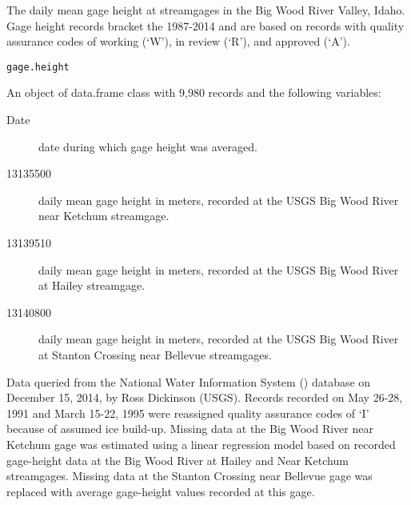 \documentclass[a4paper]{book}
\begin{document}
%
\begin{Description}\relax
The daily mean gage height at streamgages in the Big Wood River Valley, Idaho.
Gage height records bracket the 1987-2014 and are based on records with
quality assurance codes of working (`W'), in review (`R'), and
approved (`A').
\end{Description}
%
\begin{Usage}
\begin{verbatim}
gage.height
\end{verbatim}
\end{Usage}
%
\begin{Format}
An object of data.frame class with 9,980 records and the following variables:
\begin{description}

\item[Date] date during which gage height was averaged.
\item[13135500] daily mean gage height in meters, recorded at the USGS
Big Wood River near Ketchum streamgage.
\item[13139510] daily mean gage height in meters, recorded at the USGS
Big Wood River at Hailey streamgage.
\item[13140800] daily mean gage height in meters, recorded at the USGS
Big Wood River at Stanton Crossing near Bellevue streamgages.

\end{description}
\end{Format}
%
\begin{Source}\relax
Data queried from the National Water Information System
() database on December 15, 2014,
by Ross Dickinson (USGS).
Records recorded on May 26-28, 1991 and March 15-22, 1995 were reassigned
quality assurance codes of `I' because of assumed ice build-up.
Missing data at the Big Wood River near Ketchum gage was estimated using a
linear regression model based on recorded gage-height data at the Big Wood River at
Hailey and Near Ketchum streamgages.
Missing data at the Stanton Crossing near Bellevue gage was replaced with
average gage-height values recorded at this gage.
\end{Source}
\end{document}
